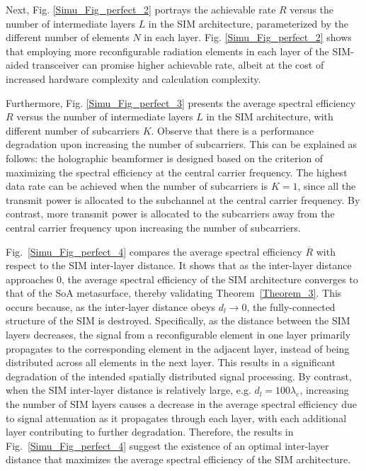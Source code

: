 \documentclass[lettersize,journal]{IEEEtran}
\theoremstyle{remark}
\begin{document}
Next, Fig. \ref{Simu_Fig_perfect_2} portrays the achievable rate $R$ versus the number of intermediate layers $L$ in the SIM architecture, parameterized by the different number of elements $N$ in each layer. Fig. \ref{Simu_Fig_perfect_2} shows that employing more reconfigurable radiation elements in each layer of the SIM-aided transceiver can promise higher achievable rate, albeit at the cost of increased hardware complexity and calculation complexity.

Furthermore, Fig. \ref{Simu_Fig_perfect_3} presents the average spectral efficiency $R$ versus the number of intermediate layers $L$ in the SIM architecture, with different number of subcarriers $K$. Observe that there is a performance degradation upon increasing the number of subcarriers. This can be explained as follows: the holographic beamformer is designed based on the criterion of maximizing the spectral efficiency at the central carrier frequency. The highest data rate can be achieved when the number of subcarriers is $K=1$, since all the transmit power is allocated to the subchannel at the central carrier frequency. By contrast, more transmit power is allocated to the subcarriers away from the central carrier frequency upon increasing the number of subcarriers.

Fig.~\ref{Simu_Fig_perfect_4} compares the average spectral efficiency $\overline{R}$ with respect to the SIM inter-layer distance. It shows that as the inter-layer distance approaches 0, the average spectral efficiency of the SIM architecture converges to that of the SoA metasurface, thereby validating Theorem~\ref{Theorem_3}. This occurs because, as the inter-layer distance obeys $d_l\rightarrow0$, the fully-connected structure of the SIM is destroyed. Specifically, as the distance between the SIM layers decreases, the signal from a reconfigurable element in one layer primarily propagates to the corresponding element in the adjacent layer, instead of being distributed across all elements in the next layer. This results in a significant degradation of the intended spatially distributed signal processing. By contrast, when the SIM inter-layer distance is relatively large, e.g. $d_l=100\lambda_\mathrm{c}$, increasing the number of SIM layers causes a decrease in the average spectral efficiency due to signal attenuation as it propagates through each layer, with each additional layer contributing to further degradation. Therefore, the results in Fig.~\ref{Simu_Fig_perfect_4} suggest the existence of an optimal inter-layer distance that maximizes the average spectral efficiency of the SIM architecture.
\end{document}
